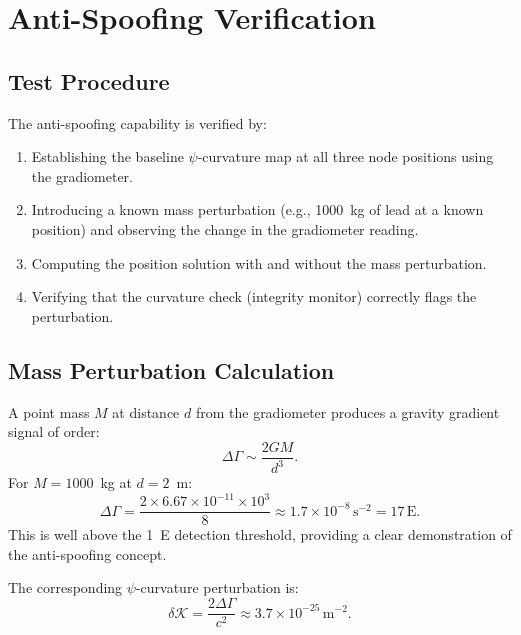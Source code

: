 \documentclass[12pt,letterpaper]{article}
\begin{document}
\section{Anti-Spoofing Verification}

\subsection{Test Procedure}

The anti-spoofing capability is verified by:
\begin{enumerate}
\item Establishing the baseline $\psi$-curvature map at all three
node positions using the gradiometer.
\item Introducing a known mass perturbation (e.g., 1000~kg of lead at a
known position) and observing the change in the gradiometer reading.
\item Computing the position solution with and without the mass perturbation.
\item Verifying that the curvature check (integrity monitor) correctly
flags the perturbation.
\end{enumerate}

\subsection{Mass Perturbation Calculation}

A point mass $M$ at distance $d$ from the gradiometer produces a
gravity gradient signal of order:
\begin{equation}
\Delta\Gamma \sim \frac{2GM}{d^3}.
\end{equation}
For $M = 1000$~kg at $d = 2$~m:
\begin{equation}
\Delta\Gamma = \frac{2\times 6.67\times10^{-11}\times 10^3}{8}
\approx 1.7\times10^{-8}\,\text{s}^{-2} = 17\,\text{E}.
\end{equation}
This is well above the 1~E detection threshold, providing a clear
demonstration of the anti-spoofing concept.

The corresponding $\psi$-curvature perturbation is:
\begin{equation}
\delta\mathcal{K} = \frac{2\Delta\Gamma}{c^2}
\approx 3.7\times10^{-25}\,\text{m}^{-2}.
\end{equation}
\end{document}
